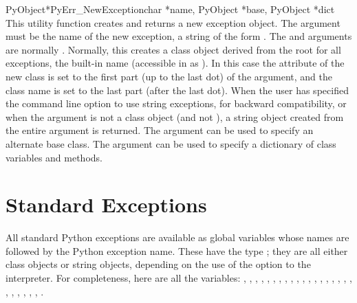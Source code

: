 \documentclass{manual}
\begin{document}
\begin{cfuncdesc}{PyObject*}{PyErr_NewException}{char *name,
                                                 PyObject *base,
                                                 PyObject *dict}
This utility function creates and returns a new exception object.  The
 argument must be the name of the new exception, a \C{} string
of the form .  The  and 
arguments are normally \NULL{}.  Normally, this creates a class
object derived from the root for all exceptions, the built-in name
 (accessible in \C{} as ).
In this case the  attribute of the new class is set to the
first part (up to the last dot) of the  argument, and the
class name is set to the last part (after the last dot).  When the
user has specified the  command line option to use string
exceptions, for backward compatibility, or when the 
argument is not a class object (and not \NULL{}), a string object
created from the entire  argument is returned.  The
 argument can be used to specify an alternate base class.
The  argument can be used to specify a dictionary of class
variables and methods.
\end{cfuncdesc}


\section{Standard Exceptions \label{standardExceptions}}

All standard Python exceptions are available as global variables whose
names are  followed by the Python exception name.
These have the type ; they are all either class
objects or string objects, depending on the use of the 
option to the interpreter.  For completeness, here are all the
variables:
,
,
,
,
,
,
,
,
,
,
,
,
,
,
,
,
,
,
,
,
,
,
,
,
,
.
\end{document}

